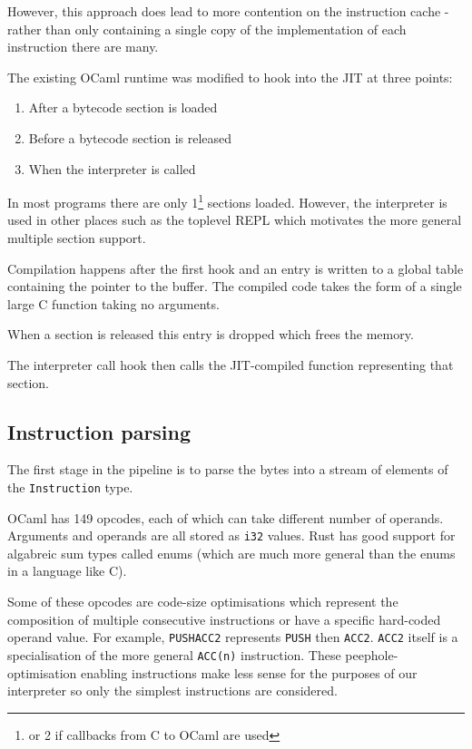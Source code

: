 However, this approach does lead to more contention on the instruction cache - rather than only
containing a single copy of the implementation of each instruction there are many.


The existing OCaml runtime was modified to hook into the JIT at three points:

\begin{enumerate}
      \item After a bytecode section is loaded
      \item Before a bytecode section is released
      \item When the interpreter is called
\end{enumerate}

In most programs there are only 1\footnote{or 2 if callbacks from C to OCaml are used} sections
loaded. However, the interpreter is used in other places such as the toplevel REPL which motivates
the more general multiple section support.

Compilation happens after the first hook and an entry is written to a global table containing the
pointer to the buffer. The compiled code takes the form of a single large C function taking no
arguments.

When a section is released this entry is dropped which frees the memory.

The interpreter call hook then calls the JIT-compiled function representing that section.

\subsection{Instruction parsing}

The first stage in the pipeline is to parse the bytes into a stream of elements of the
\texttt{Instruction} type.

\label{instruction-type}

OCaml has 149 opcodes, each of which can take different number of operands. Arguments and operands
are all stored as \texttt{i32} values. Rust has good support for algabreic sum types called enums
(which are much more general than the enums in a language like C).

Some of these opcodes are code-size optimisations which represent the composition of multiple
consecutive instructions or have a specific hard-coded operand value. For example,
\texttt{PUSHACC2} represents \texttt{PUSH} then \texttt{ACC2}. \texttt{ACC2} itself is a
specialisation of the more general \texttt{ACC(n)} instruction. These peephole-optimisation
enabling instructions make less sense for the purposes of our interpreter so only the simplest
instructions are considered.

